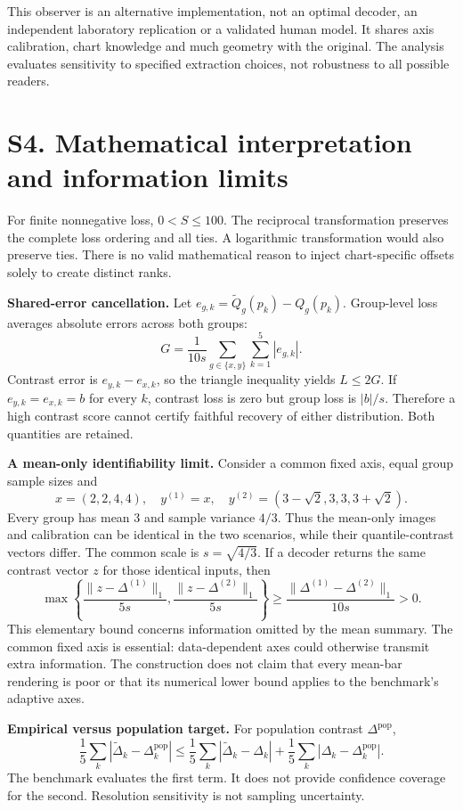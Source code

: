 \documentclass[10pt]{article}
\begin{document}
This observer is an alternative implementation, not an optimal decoder, an independent laboratory replication or a validated human model. It shares axis calibration, chart knowledge and much geometry with the original. The analysis evaluates sensitivity to specified extraction choices, not robustness to all possible readers.

\section*{S4. Mathematical interpretation and information limits}
For finite nonnegative loss, $0<S\leq100$. The reciprocal transformation preserves the complete loss ordering and all ties. A logarithmic transformation would also preserve ties. There is no valid mathematical reason to inject chart-specific offsets solely to create distinct ranks.

\textbf{Shared-error cancellation.} Let $e_{g,k}=\widetilde Q_g(p_k)-Q_g(p_k)$. Group-level loss averages absolute errors across both groups:
\[G=\frac{1}{10s}\sum_{g\in\{x,y\}}\sum_{k=1}^{5}|e_{g,k}|.\]
Contrast error is $e_{y,k}-e_{x,k}$, so the triangle inequality yields $L\leq2G$. If $e_{y,k}=e_{x,k}=b$ for every $k$, contrast loss is zero but group loss is $|b|/s$. Therefore a high contrast score cannot certify faithful recovery of either distribution. Both quantities are retained.

\textbf{A mean-only identifiability limit.} Consider a common fixed axis, equal group sample sizes and
\[
 x=(2,2,4,4),\quad y^{(1)}=x,\quad y^{(2)}=(3-\sqrt2,3,3,3+\sqrt2).
\]
Every group has mean 3 and sample variance $4/3$. Thus the mean-only images and calibration can be identical in the two scenarios, while their quantile-contrast vectors differ. The common scale is $s=\sqrt{4/3}$. If a decoder returns the same contrast vector $z$ for those identical inputs, then
\[
 \max\!\left\{\frac{\|z-\Delta^{(1)}\|_1}{5s},\frac{\|z-\Delta^{(2)}\|_1}{5s}\right\}
 \geq \frac{\|\Delta^{(1)}-\Delta^{(2)}\|_1}{10s}>0.
\]
This elementary bound concerns information omitted by the mean summary. The common fixed axis is essential: data-dependent axes could otherwise transmit extra information. The construction does not claim that every mean-bar rendering is poor or that its numerical lower bound applies to the benchmark's adaptive axes.

\textbf{Empirical versus population target.} For population contrast $\Delta^{\mathrm{pop}}$,
\[
\frac15\sum_k|\widetilde\Delta_k-\Delta^{\mathrm{pop}}_k|
\leq\frac15\sum_k|\widetilde\Delta_k-\Delta_k|+\frac15\sum_k|\Delta_k-\Delta^{\mathrm{pop}}_k|.
\]
The benchmark evaluates the first term. It does not provide confidence coverage for the second. Resolution sensitivity is not sampling uncertainty.
\end{document}
